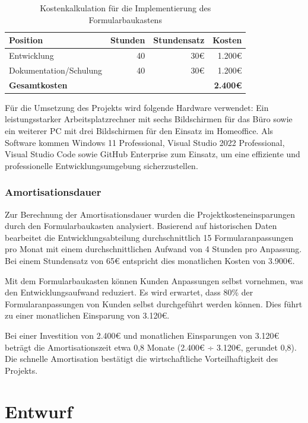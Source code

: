 \documentclass[a4paper,11pt]{article}
\begin{document}
\begin{table}[h]
\centering
\begin{tabular}{lrrr}
\toprule
\textbf{Position} & \textbf{Stunden} & \textbf{Stundensatz} & \textbf{Kosten} \\
\midrule
Entwicklung & 40 & 30€ & 1.200€ \\
Dokumentation/Schulung & 40 & 30€ & 1.200€ \\
\midrule
\textbf{Gesamtkosten} & & & \textbf{2.400€} \\
\bottomrule
\end{tabular}
\caption{Kostenkalkulation für die Implementierung des Formularbaukastens}
\end{table}

\noindent Für die Umsetzung des Projekts wird folgende Hardware verwendet: Ein leistungsstarker Arbeitsplatzrechner mit sechs Bildschirmen für das Büro sowie ein weiterer PC mit drei Bildschirmen für den Einsatz im Homeoffice. Als Software kommen Windows 11 Professional, Visual Studio 2022 Professional, Visual Studio Code sowie GitHub Enterprise zum Einsatz, um eine effiziente und professionelle Entwicklungsumgebung sicherzustellen.

\subsubsection{Amortisationsdauer}
Zur Berechnung der Amortisationsdauer wurden die Projektkosteneinsparungen durch den Formularbaukasten analysiert. Basierend auf historischen Daten bearbeitet die Entwicklungsabteilung durchschnittlich 15 Formularanpassungen pro Monat mit einem durchschnittlichen Aufwand von 4 Stunden pro Anpassung. Bei einem Stundensatz von 65€ entspricht dies monatlichen Kosten von 3.900€.

\noindent Mit dem Formularbaukasten können Kunden Anpassungen selbst vornehmen, was den Entwicklungsaufwand reduziert. Es wird erwartet, dass 80\% der Formularanpassungen von Kunden selbst durchgeführt werden können. Dies führt zu einer monatlichen Einsparung von 3.120€.


\noindent Bei einer Investition von 2.400€ und monatlichen Einsparungen von 3.120€ beträgt die Amortisationszeit etwa 0,8 Monate (2.400€ ÷ 3.120€, gerundet 0,8). Die schnelle Amortisation bestätigt die wirtschaftliche Vorteilhaftigkeit des Projekts.

\section{Entwurf}
\end{document}
